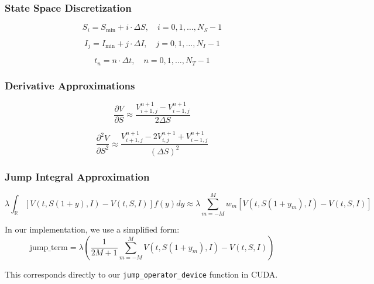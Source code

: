 \documentclass[twocolumn,ieee]{arithmaxresearch}
\begin{document}
\begin{onecolumn}
\subsubsection{State Space Discretization}
\begin{equation}
S_i = S_{\min} + i \cdot \Delta S, \quad i = 0, 1, \ldots, N_S-1
\end{equation}

\begin{equation}
I_j = I_{\min} + j \cdot \Delta I, \quad j = 0, 1, \ldots, N_I-1
\end{equation}

\begin{equation}
t_n = n \cdot \Delta t, \quad n = 0, 1, \ldots, N_T-1
\end{equation}

\subsubsection{Derivative Approximations}
\begin{equation}
\frac{\partial V}{\partial S} \approx \frac{V^{n+1}_{i+1,j} - V^{n+1}_{i-1,j}}{2\Delta S}
\end{equation}

\begin{equation}
\frac{\partial^2 V}{\partial S^2} \approx \frac{V^{n+1}_{i+1,j} - 2V^{n+1}_{i,j} + V^{n+1}_{i-1,j}}{(\Delta S)^2}
\end{equation}

\subsubsection{Jump Integral Approximation}
\begin{equation}
\lambda \int_{\mathbb{R}} \left[V(t, S(1+y), I) - V(t, S, I)\right] f(y) dy \approx \lambda \sum_{m=-M}^{M} w_m \left[V(t, S(1+y_m), I) - V(t, S, I)\right]
\end{equation}

In our implementation, we use a simplified form:
\begin{equation}
\text{jump\_term} = \lambda \left(\frac{1}{2M+1}\sum_{m=-M}^{M} V(t, S(1+y_m), I) - V(t, S, I)\right)
\end{equation}

This corresponds directly to our \texttt{jump\_operator\_device} function in CUDA.


\end{onecolumn}
\end{document}
